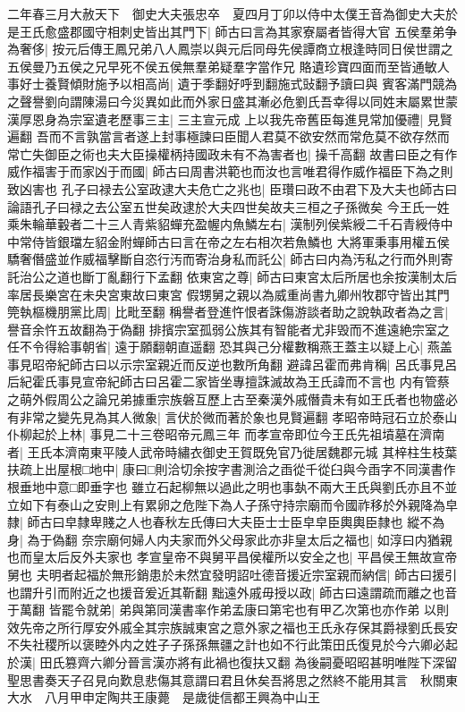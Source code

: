 二年春三月大赦天下　御史大夫張忠卒　夏四月丁卯以侍中太僕王音為御史大夫於是王氏愈盛郡國守相刺史皆出其門下|{
	師古曰言為其家寮屬者皆得大官}
五侯羣弟争為奢侈|{
	按元后傳王鳳兄弟八人鳳崇以與元后同母先侯譚商立根逢時同日侯世謂之五侯曼乃五侯之兄早死不侯五侯無羣弟疑羣字當作兄}
賂遺珍寶四面而至皆通敏人事好士養賢傾財施予以相高尚|{
	遺于季翻好呼到翻施式䜴翻予讀曰與}
賓客滿門競為之聲譽劉向謂陳湯曰今災異如此而外家日盛其漸必危劉氏吾幸得以同姓末屬累世蒙漢厚恩身為宗室遺老歷事三主|{
	三主宣元成}
上以我先帝舊臣每進見常加優禮|{
	見賢遍翻}
吾而不言孰當言者遂上封事極諫曰臣聞人君莫不欲安然而常危莫不欲存然而常亡失御臣之術也夫大臣操權柄持國政未有不為害者也|{
	操千高翻}
故書曰臣之有作威作福害于而家凶于而國|{
	師古曰周書洪範也而汝也言唯君得作威作福臣下為之則致凶害也}
孔子曰禄去公室政逮大夫危亡之兆也|{
	臣瓚曰政不由君下及大夫也師古曰論語孔子曰禄之去公室五世矣政逮於大夫四世矣故夫三桓之子孫微矣}
今王氏一姓乘朱輪華轂者二十三人青紫貂蟬充盈幄内魚鱗左右|{
	漢制列侯紫綬二千石青綬侍中中常侍皆銀璫左貂金附蟬師古曰言在帝之左右相次若魚鱗也}
大將軍秉事用權五侯驕奢僭盛並作威福擊斷自恣行汚而寄治身私而託公|{
	師古曰内為汚私之行而外則寄託治公之道也斷丁亂翻行下孟翻}
依東宮之尊|{
	師古曰東宮太后所居也余按漢制太后率居長樂宮在未央宮東故曰東宮}
假甥舅之親以為威重尚書九卿州牧郡守皆出其門筦執樞機朋黨比周|{
	比毗至翻}
稱譽者登進忤恨者誅傷游談者助之說執政者為之言|{
	譽音余忤五故翻為于偽翻}
排擯宗室孤弱公族其有智能者尤非毁而不進遠絶宗室之任不令得給事朝省|{
	遠于願翻朝直遥翻}
恐其與己分權數稱燕王蓋主以疑上心|{
	燕盖事見昭帝紀師古曰以示宗室親近而反逆也數所角翻}
避諱呂霍而弗肯稱|{
	呂氏事見呂后紀霍氏事見宣帝紀師古曰呂霍二家皆坐專擅誅滅故為王氏諱而不言也}
内有管蔡之萌外假周公之論兄弟據重宗族磐互歷上古至秦漢外戚僭貴未有如王氏者也物盛必有非常之變先見為其人微象|{
	言伏於微而著於象也見賢遍翻}
孝昭帝時冠石立於泰山仆柳起於上林|{
	事見二十三卷昭帝元鳳三年}
而孝宣帝即位今王氏先祖墳墓在濟南者|{
	王氏本濟南東平陵人武帝時繡衣御史王賀既免官乃徙居魏郡元城}
其梓柱生枝葉扶疏上出屋根□地中|{
	康曰□則洽切余按字書測洽之臿從千從臼與今臿字不同漢書作根垂地中意□即垂字也}
雖立石起柳無以過此之明也事埶不兩大王氏與劉氏亦且不並立如下有泰山之安則上有累卵之危陛下為人子孫守持宗廟而令國祚移於外親降為皁隸|{
	師古曰皁隸卑賤之人也春秋左氏傳曰大夫臣士士臣皁皁臣輿輿臣隸也}
縱不為身|{
	為于偽翻}
奈宗廟何婦人内夫家而外父母家此亦非皇太后之福也|{
	如淳曰内猶親也而皇太后反外夫家也}
孝宣皇帝不與舅平昌侯權所以安全之也|{
	平昌侯王無故宣帝舅也}
夫明者起福於無形銷患於未然宜發明詔吐德音援近宗室親而納信|{
	師古曰援引也謂升引而附近之也援音爰近其靳翻}
黜遠外戚毋授以政|{
	師古曰遠謂疏而離之也音于萬翻}
皆罷令就弟|{
	弟與第同漢書率作弟孟康曰第宅也有甲乙次第也亦作弟}
以則效先帝之所行厚安外戚全其宗族誠東宮之意外家之福也王氏永存保其爵禄劉氏長安不失社稷所以褒睦外内之姓子子孫孫無疆之計也如不行此策田氏復見於今六卿必起於漢|{
	田氏篡齊六卿分晉言漢亦將有此禍也復扶又翻}
為後嗣憂昭昭甚明唯陛下深留聖思書奏天子召見向歎息悲傷其意謂曰君且休矣吾將思之然終不能用其言　秋關東大水　八月甲申定陶共王康薨　是歲徙信都王興為中山王

